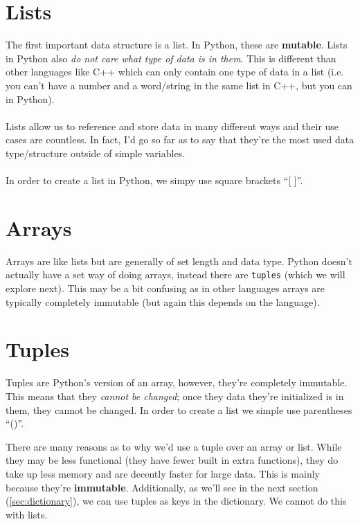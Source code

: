 \documentclass[12pt,a4paper]{book}
\begin{document}
		\section{Lists}
			The first important data structure is a list. In Python, these are \textbf{mutable}. Lists in Python also \textit{do not care what type of data is in them}. This is different than other languages like C++ which can only contain one type of data in a list (i.e. you can't have a number and a word/string in the same list in C++, but you can in Python).
			\\\\
			Lists allow us to reference and store data in many different ways and their use cases are countless. In fact, I'd go so far as to say that they're the most used data type/structure outside of simple variables.
			\\\\
			In order to create a list in Python, we simpy use square brackets ``[ ]''.
  			 
		\section{Arrays}
			Arrays are like lists but are generally of set length and data type. Python doesn't actually have a set way of doing arrays, instead there are \texttt{tuples} (which we will explore next). This may be a bit confusing as in other languages arrays are typically completely immutable (but again this depends on the language).
		
		\section{Tuples}
			Tuples are Python's version of an array, however, they're completely immutable. This means that they \textit{cannot be changed}; once they data they're initialized is in them, they cannot be changed. In order to create a list we simple use parentheses ``()''. 
			
			
			
			There are many reasons as to why we'd use a tuple over an array or list. While they may be less functional (they have fewer built in extra functions), they do take up less memory and are decently faster for large data. This is mainly because they're \textbf{immutable}. Additionally, as we'll see in the next section (\ref{sec:dictionary}), we can use tuples as keys in the dictionary. We cannot do this with lists.
\end{document}
